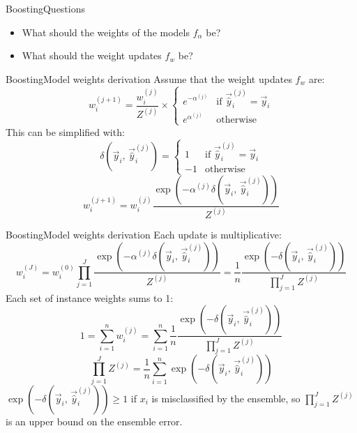 \documentclass[10pt]{beamer}
\begin{document}
\begin{frame}{Boosting}{Questions}
  \begin{itemize}
    \item What should the weights of the models $f_\alpha$ be?
    \item What should the weight updates $f_w$ be?
  \end{itemize}
\end{frame}

\begin{frame}{Boosting}{Model weights derivation}
  Assume that the weight updates $f_w$ are:
  \begin{equation*}
    w^{(j+1)}_i
    =
    \frac{w^{(j)}_i}{Z^{(j)}}
    \times
    \begin{cases}
      e^{-\alpha^{(j)}} & \text{if } \vec{\hat{y}}_i^{(j)} = \vec{y}_i
      \\
      e^{\alpha^{(j)}}  & \text{otherwise}
    \end{cases}
  \end{equation*}
  This can be simplified with:
  \begin{equation*}
    \delta(\vec{y}_i,\,\vec{\hat{y}}_i^{(j)})
    =
    \begin{cases}
      1  & \text{if } \vec{\hat{y}}_i^{(j)} = \vec{y}_i
      \\
      -1 & \text{otherwise}
    \end{cases}
  \end{equation*}
  \begin{equation*}
    w^{(j+1)}_i
    =
    w^{(j)}_i\frac{\exp(-\alpha^{(j)}\delta(\vec{y}_i,\,\vec{\hat{y}}_i^{(j)}))}{Z^{(j)}}
  \end{equation*}
\end{frame}

\begin{frame}{Boosting}{Model weights derivation}
  Each update is multiplicative:
  \begin{equation*}
    w^{(J)}_i
    =
    w^{(0)}_i
    \prod_{j=1}^{J}
    \frac{\exp(-\alpha^{(j)}\delta(\vec{y}_i,\,\vec{\hat{y}}_i^{(j)}))}{Z^{(j)}}
    =
    \frac{1}{n}
    \frac{\exp(-\delta(\vec{y}_i,\,\vec{\hat{y}}_i^{(j)}))}{\prod_{j=1}^{J}Z^{(j)}}
  \end{equation*}
  Each set of instance weights sums to 1:
  \begin{equation*}
    1
    =
    \sum_{i = 1}^{n}w^{(j)}_i
    =
    \sum_{i = 1}^{n}
    \frac{1}{n}
    \frac{\exp(-\delta(\vec{y}_i,\,\vec{\hat{y}}_i^{(j)}))}{\prod_{j=1}^{J}Z^{(j)}}
  \end{equation*}
  \begin{equation*}
    \prod_{j=1}^{J}
    Z^{(j)} = \frac{1}{n}\sum_{i = 1}^{n}
    \exp(-\delta(\vec{y}_i,\,\vec{\hat{y}}_i^{(j)}))
  \end{equation*}
  $\exp(-\delta(\vec{y}_i,\,\vec{\hat{y}}_i^{(j)})) \geq 1$ if $x_i$ is
  misclassified by the ensemble, so $\prod_{j=1}^{J} Z^{(j)}$ is an upper bound
  on the ensemble error.
\end{frame}
\end{document}
